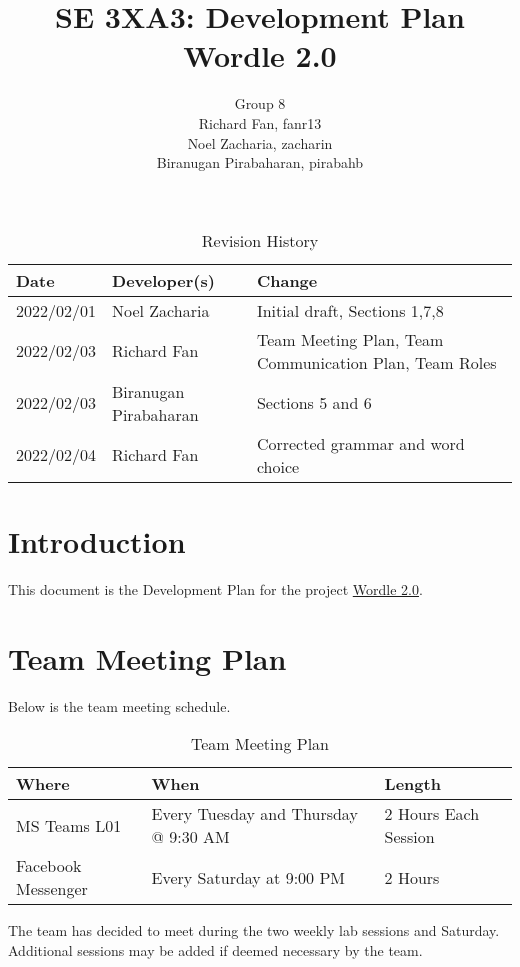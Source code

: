 \documentclass{article}
\title{SE 3XA3: Development Plan\\Wordle 2.0}
\author{Group 8
	\\ Richard Fan, fanr13
	\\ Noel Zacharia, zacharin
	\\ Biranugan Pirabaharan, pirabahb
}
\date{}
\begin{document}
	
	\begin{table}[hp]
		\caption{Revision History} \label{TblRevisionHistory}
		\begin{tabularx}{\textwidth}{llX}
			\toprule
			\textbf{Date} & \textbf{Developer(s)} & \textbf{Change}\\
			\midrule
			2022/02/01 & Noel Zacharia & Initial draft, Sections 1,7,8\\
			2022/02/03 & Richard Fan & Team Meeting Plan, Team Communication 
			Plan, Team Roles\\
			2022/02/03 & Biranugan Pirabaharan & Sections 5 and 6\\
			2022/02/04 & Richard Fan & Corrected grammar and word choice\\
			\bottomrule
		\end{tabularx}
	\end{table}
	
	\newpage
	
	\maketitle
	
	\section{Introduction}
	This document is the Development Plan for the project 
	\href{https://gitlab.cas.mcmaster.ca/zacharin/wordle_clone_3xa3_l01_group8}{Wordle
		2.0}.
	
	\section{Team Meeting Plan}
	Below is the team meeting schedule.
	\begin{table}[hp]
		\begin{tabularx}{\textwidth}{|l|l|X|}
			\toprule
			\textbf{Where} & \textbf{When} & \textbf{Length}\\
			\midrule
			MS Teams L01 & Every Tuesday and Thursday @ 9:30 AM & 2 Hours Each 
			Session\\
			Facebook Messenger & Every Saturday at 9:00 PM & 2 Hours\\
			\bottomrule
		\end{tabularx}
		\caption{Team Meeting Plan} \label{tab:teamMeetingPlan}
	\end{table}
	\newline
	The team has decided to meet during the two weekly lab sessions and 
	Saturday. Additional sessions may be added if deemed necessary by the team.
\end{document}
